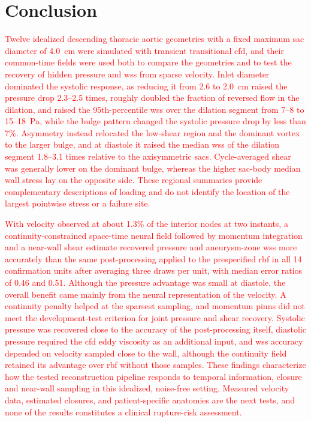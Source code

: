 \documentclass[12pt,a4paper]{article}
\newcommand{\CFD}{\ac{cfd}\xspace}
\newcommand{\PINNs}{\acp{pinn}\xspace}
\newcommand{\WSS}{\ac{wss}\xspace}
\newcommand{\RBF}{\ac{rbf}\xspace}
\theoremstyle{definition}
\numberwithin{equation}{section}
\newcommand{\revision}[1]{\textcolor{red}{#1}}
\begin{document}
\section{Conclusion}
\label{sec:conclusion}
\revision{Twelve idealized descending thoracic aortic geometries with a fixed maximum sac diameter of 4.0~cm were simulated with transient transitional \CFD, and their common-time fields were used both to compare the geometries and to test the recovery of hidden pressure and \WSS from sparse velocity. Inlet diameter dominated the systolic response, as reducing it from 2.6 to 2.0~cm raised the pressure drop 2.3--2.5 times, roughly doubled the fraction of reversed flow in the dilation, and raised the 95th-percentile \WSS over the dilation segment from 7--8 to 15--18~Pa, while the bulge pattern changed the systolic pressure drop by less than 7\%. Asymmetry instead relocated the low-shear region and the dominant vortex to the larger bulge, and at diastole it raised the median \WSS of the dilation segment 1.8--3.1 times relative to the axisymmetric sacs. Cycle-averaged shear was generally lower on the dominant bulge, whereas the higher sac-body median wall stress lay on the opposite side. These regional summaries provide complementary descriptions of loading and do not identify the location of the largest pointwise stress or a failure site.}

\revision{With velocity observed at about 1.3\% of the interior nodes at two instants, a continuity-constrained space-time neural field followed by momentum integration and a near-wall shear estimate recovered pressure and aneurysm-zone \WSS more accurately than the same post-processing applied to the prespecified \RBF in all 14 confirmation units after averaging three draws per unit, with median error ratios of 0.46 and 0.51. Although the pressure advantage was small at diastole, the overall benefit came mainly from the neural representation of the velocity. A continuity penalty helped at the sparsest sampling, and momentum \PINNs did not meet the development-test criterion for joint pressure and shear recovery. Systolic pressure was recovered close to the accuracy of the post-processing itself, diastolic pressure required the \CFD eddy viscosity as an additional input, and \WSS accuracy depended on velocity sampled close to the wall, although the continuity field retained its advantage over \RBF without those samples. These findings characterize how the tested reconstruction pipeline responds to temporal information, closure and near-wall sampling in this idealized, noise-free setting. Measured velocity data, estimated closures, and patient-specific anatomies are the next tests, and none of the results constitutes a clinical rupture-risk assessment.}
\end{document}
